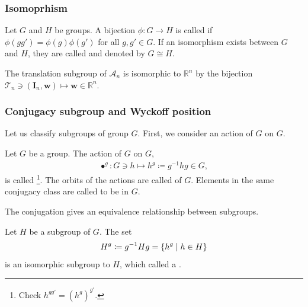 \subsubsection{Isomoprhism}

\begin{screen}
  \begin{defn}[isomorphism]
    Let $G$ and $H$ be groups.
    A bijection $\phi: G \to H$ is called  if $\phi(gg') = \phi(g) \phi(g')$ for all $g, g' \in G$.
    If an isomorphism exists between $G$ and $H$, they are called  and denoted by $G \cong H$.
  \end{defn}
\end{screen}

The translation subgroup of $\mathcal{A}_{n}$ is isomorphic to $\mathbb{R}^{n}$ by the bijection $\mathcal{T}_{n} \ni (\bm{I}_{n}, \bm{w}) \mapsto \bm{w} \in \mathbb{R}^{n}$.

\subsubsection{\label{sec:conjugation_wyckoff}Conjugacy subgroup and Wyckoff position}

Let us classify subgroups of group $G$.
First, we consider an action of $G$ on $G$.
\begin{screen}
  \begin{defn}[conjugation]
    Let $G$ be a group.
    The action of $G$ on $G$,
    \begin{align}
      \bullet^{g}: G \ni h \mapsto h^{g} \coloneqq g^{-1} h g \in G,
    \end{align}
    is called \footnote{
      Check $h^{gg'} = (h^{g})^{g'}$.
    }.
    The orbits of the actions are called  of $G$.
    Elements in the same conjugacy class are called to be  in $G$.
  \end{defn}
\end{screen}

The conjugation gives an equivalence relationship between subgroups.
\begin{screen}
  \begin{defn}
    Let $H$ be a subgroup of $G$.
    The set
    \begin{align}
      H^{g} \coloneqq g^{-1} H g = \left\{  h^{g}  \mathrel{}\middle|\mathrel{}  h \in H \right\}
    \end{align}
    is an isomorphic subgroup to $H$, which called a .
  \end{defn}
\end{screen}


